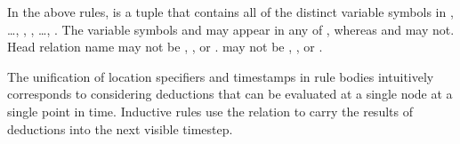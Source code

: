 In the above rules,  is a tuple that contains all of the distinct variable
symbols in , \ldots, , , \ldots,
.  The variable symbols  and  may appear in
any of , whereas  and  may not.
Head relation name  may not be , , or .
 may not be
, , or \dedalus{<}. %

The unification of location specifiers and timestamps in rule bodies intuitively corresponds to considering deductions that can be evaluated at a single node at a single point in time.  Inductive rules use the  relation to carry the results of deductions into the next visible timestep.

\begin{comment}
\subsection{Causality rewrite}

As written, asynchronous rules can allow messages to travel back in time.  Intuitively, we strive to allow only those models that are causally plausible: a message sent by a node at local timestamp $s$ cannot cause a message to arrive in the past of node $x$ (i.e., before local timestamp $s$).

\begin{Drules}
\drule{notZero(T)}
      {succ(T,S)}
\drule{zero(T)}
      {time(T), \lnot notZero(T)}
\end{Drules}

\begin{Drules}
\drule{rcvClock(X,S,Y,S)}
      {node(X), node(Y), X \neq Y, zero(S)}
\drule{rcvClock(X,S,X,S')}
      {node(X), timeSucc(S,S')}
\drule{rcvClock(X,S',Y,T)}
      {clock(X,S,Y,T), X \neq Y, timeSucc(S,S')}
\end{Drules}

\footnote{We can get \neq from < by disjunction.}

Given the following asynchronous rule, without any causality enforced:

...

We rewrite it as the following batch of rules:

...
\end{comment}

